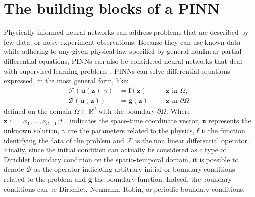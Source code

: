 \documentclass[pdflatex,sn-basic]{sn-jnl}%
\theoremstyle{thmstyleone}%
\theoremstyle{thmstyletwo}%
\theoremstyle{thmstylethree}%
\begin{document}


\section{The building blocks of a PINN}\label{sec2}





Physically-informed neural networks can address problems that are described by few data, or noisy experiment observations.
%
Because they can use known data while adhering to any given physical law specified by general nonlinear partial differential equations, PINNs can also be considered neural networks that deal with supervised learning problems
\citep{Gos2020_TransferLearningEnhanced_AniGACR}.
%
PINNs can solve differential equations expressed, in the most general form, like:
\begin{equation}\label{eq:general_form}
  \begin{aligned}
    \mathcal{F}(\bm{u}(\bm{z}); \gamma ) &= \bm{f}(\bm{z}) \quad &&  \bm{z} \text{ in } \Omega,\\
    \mathcal{B}(\bm{u}(\bm{z})) &= \bm{g}(\bm{z})  \quad &&  \bm{z} \text{ in } \partial\Omega
  \end{aligned}
\end{equation} %
defined on the domain $\Omega \subset \mathbb{R}^d$ with the boundary $\partial \Omega$.
Where 
$\bm{z} := [x_1,\ldots,x_{d-1};t]$ indicates the space-time coordinate vector, %
$\bm{u}$ represents the unknown solution, $\gamma$ are the parameters related to the physics, $\bm{f}$ is the function identifying the data of the problem and $\mathcal{F}$ is the non linear differential operator.
Finally, since the initial condition can actually be considered as a type of Dirichlet boundary condition on the spatio-temporal domain, it is possible to 
denote 
$\mathcal{B}$ as the operator indicating arbitrary initial or boundary conditions related to the problem and $\bm{g}$ the boundary function. Indeed, the boundary conditions can be Dirichlet, Neumann, Robin, or periodic boundary conditions.
\end{document}
